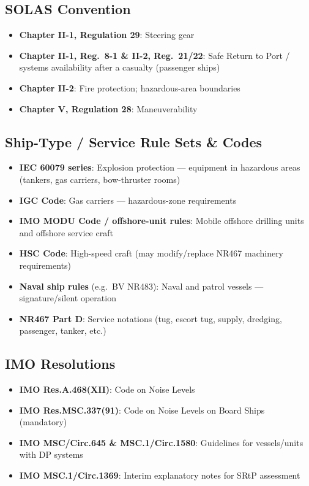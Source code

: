 \documentclass[11pt,a4paper]{report}
\begin{document}
\subsection{SOLAS Convention}
\begin{itemize}[leftmargin=*]
\item \textbf{Chapter II-1, Regulation 29}: Steering gear
\item \textbf{Chapter II-1, Reg.\ 8-1 \& II-2, Reg.\ 21/22}: Safe Return to Port / systems availability after a casualty (passenger ships)
\item \textbf{Chapter II-2}: Fire protection; hazardous-area boundaries
\item \textbf{Chapter V, Regulation 28}: Maneuverability
\end{itemize}

\subsection{Ship-Type / Service Rule Sets \& Codes}
\begin{itemize}[leftmargin=*]
\item \textbf{IEC 60079 series}: Explosion protection --- equipment in hazardous areas (tankers, gas carriers, bow-thruster rooms)
\item \textbf{IGC Code}: Gas carriers --- hazardous-zone requirements
\item \textbf{IMO MODU Code / offshore-unit rules}: Mobile offshore drilling units and offshore service craft
\item \textbf{HSC Code}: High-speed craft (may modify/replace NR467 machinery requirements)
\item \textbf{Naval ship rules} (e.g.\ BV NR483): Naval and patrol vessels --- signature/silent operation
\item \textbf{NR467 Part D}: Service notations (tug, escort tug, supply, dredging, passenger, tanker, etc.)
\end{itemize}

\subsection{IMO Resolutions}
\begin{itemize}[leftmargin=*]
\item \textbf{IMO Res.A.468(XII)}: Code on Noise Levels
\item \textbf{IMO Res.MSC.337(91)}: Code on Noise Levels on Board Ships (mandatory)
\item \textbf{IMO MSC/Circ.645 \& MSC.1/Circ.1580}: Guidelines for vessels/units with DP systems
\item \textbf{IMO MSC.1/Circ.1369}: Interim explanatory notes for SRtP assessment
\end{itemize}
\end{document}
